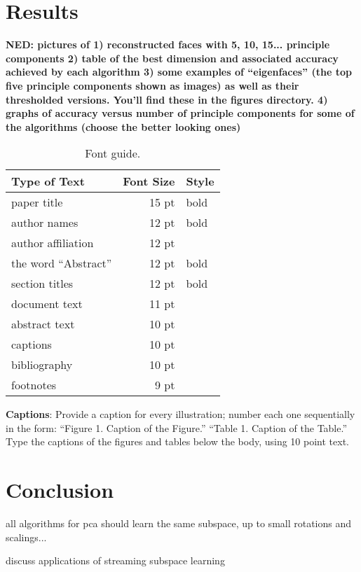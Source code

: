 \documentclass[11pt,letterpaper]{article}
\begin{document}
\section{Results}

{\bf NED: pictures of 1) reconstructed faces with 5, 10, 15... principle components 
2) table of the best dimension and associated accuracy achieved by each algorithm 
3) some examples of ``eigenfaces'' (the top five principle components shown as images) as well as their thresholded versions. You'll find these in the figures directory. 
4) graphs of accuracy versus number of principle components for some of the algorithms (choose the better looking ones)}

\begin{table}
\begin{center}
\begin{tabular}{|l|rl|}
\hline \bf Type of Text & \bf Font Size & \bf Style \\ \hline
paper title & 15 pt & bold \\
author names & 12 pt & bold \\
author affiliation & 12 pt & \\
the word ``Abstract'' & 12 pt & bold \\
section titles & 12 pt & bold \\
document text & 11 pt  &\\
abstract text & 10 pt & \\
captions & 10 pt & \\
bibliography & 10 pt & \\
footnotes & 9 pt & \\
\hline
\end{tabular}
\end{center}
\caption{\label{font-table} Font guide. }
\end{table}

{\bf Captions}: Provide a caption for every illustration; number each one
sequentially in the form:  ``Figure 1. Caption of the Figure.'' ``Table 1.
Caption of the Table.''  Type the captions of the figures and 
tables below the body, using 10 point text.  

\section{Conclusion}

all algorithms for pca should learn the same subspace, up to small rotations and scalings...

discuss applications of streaming subspace learning
\end{document}

